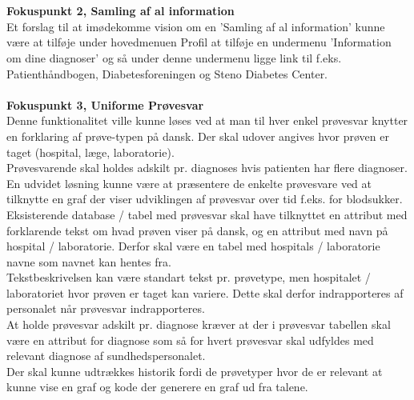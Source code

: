 \\\\
 \textbf{Fokuspunkt 2, Samling af al information} \\
 Et forslag til at imødekomme vision om en 'Samling af al information' kunne være at tilføje under hovedmenuen Profil at tilføje en undermenu 'Information om dine diagnoser' og så under denne undermenu ligge link til f.eks. Patienthåndbogen, Diabetesforeningen og Steno Diabetes Center.
 \\\\ 
 \textbf{Fokuspunkt 3, Uniforme Prøvesvar} \\
 Denne funktionalitet ville kunne løses ved at man til hver enkel prøvesvar knytter en forklaring af prøve-typen på dansk. Der skal udover angives hvor prøven er taget (hospital, læge, laboratorie).\\
 Prøvesvarende skal holdes adskilt pr. diagnoses hvis patienten har flere diagnoser.\\
 En udvidet løsning kunne være at præsentere de enkelte prøvesvare ved at tilknytte en graf der viser udviklingen af prøvesvar over tid f.eks. for blodsukker.\\
 Eksisterende database / tabel med prøvesvar skal have tilknyttet en attribut med forklarende tekst om hvad prøven viser på dansk, og en attribut med navn på hospital / laboratorie. Derfor skal være en tabel med hospitals / laboratorie navne som navnet kan hentes fra.\\ 
 Tekstbeskrivelsen kan være standart tekst pr. prøvetype, men hospitalet / laboratoriet hvor prøven er taget kan variere. Dette skal derfor indrapporteres af personalet når prøvesvar indrapporteres. \\
 At holde prøvesvar adskilt pr. diagnose kræver at der i prøvesvar tabellen skal være en attribut for diagnose som så for hvert prøvesvar skal udfyldes med relevant diagnose af sundhedspersonalet.\\
 Der skal kunne udtrækkes historik fordi de prøvetyper hvor de er relevant at kunne vise en graf og kode der generere en graf ud fra talene.
